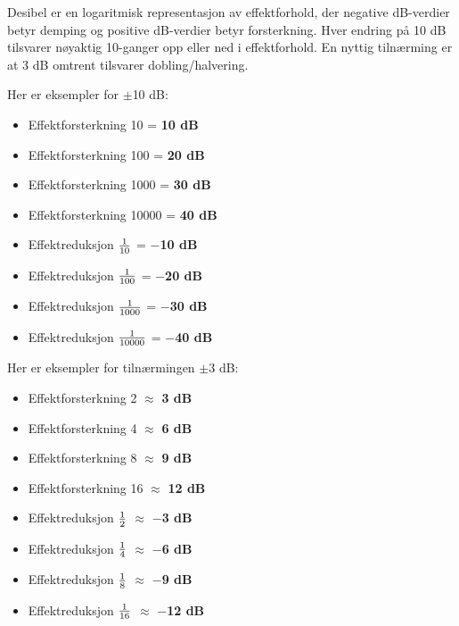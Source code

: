 

Desibel er en logaritmisk representasjon av effektforhold, der negative dB-verdier betyr demping og positive dB-verdier betyr forsterkning. Hver endring på 10 dB tilsvarer nøyaktig 10-ganger opp eller ned i effektforhold. En nyttig tilnærming er at 3 dB omtrent tilsvarer dobling/halvering.

\vskip 10pt

Her er eksempler for $\pm$10 dB:

\begin{itemize}
\item{} Effektforsterkning 10 = {\bf 10 dB}
\vskip 3pt
\item{} Effektforsterkning 100 = {\bf 20 dB}
\vskip 3pt
\item{} Effektforsterkning 1000 = {\bf 30 dB}
\vskip 3pt
\item{} Effektforsterkning 10000 = {\bf 40 dB}
\vskip 3pt
\item{} Effektreduksjon $1 \over 10$ = {\bf $-$10 dB}
\vskip 3pt
\item{} Effektreduksjon $1 \over 100$ = {\bf $-$20 dB}
\vskip 3pt
\item{} Effektreduksjon $1 \over 1000$ = {\bf $-$30 dB}
\vskip 3pt
\item{} Effektreduksjon $1 \over 10000$ = {\bf $-$40 dB}
\end{itemize}

\vskip 10pt

Her er eksempler for tilnærmingen $\pm$3 dB:

\begin{itemize}
\item{} Effektforsterkning 2 $\approx$ {\bf 3 dB}
\vskip 3pt
\item{} Effektforsterkning 4 $\approx$ {\bf 6 dB}
\vskip 3pt
\item{} Effektforsterkning 8 $\approx$ {\bf 9 dB}
\vskip 3pt
\item{} Effektforsterkning 16 $\approx$ {\bf 12 dB}
\vskip 3pt
\item{} Effektreduksjon $1 \over 2$ $\approx$ {\bf $-$3 dB}
\vskip 3pt
\item{} Effektreduksjon $1 \over 4$ $\approx$ {\bf $-$6 dB}
\vskip 3pt
\item{} Effektreduksjon $1 \over 8$ $\approx$ {\bf $-$9 dB}
\vskip 3pt
\item{} Effektreduksjon $1 \over 16$ $\approx$ {\bf $-$12 dB}
\end{itemize}


